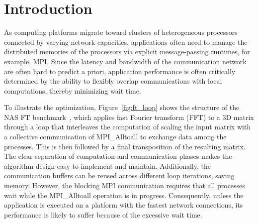 \section{Introduction}
\label{sec:intro}

As computing platforms migrate toward clusters of heterogeneous
processors connected by varying network capacities, applications often
need to manage the distributed memories of the processors via explicit
message-passing runtimes, for example, MPI.  Since the latency and
bandwidth of the communication network are often hard to predict a
priori, application performance is often critically determined by the
ability to flexibly overlap communications with local computations,
thereby minimizing wait time.

To illustrate the optimization, Figure~\ref{fig:ft_loop} shows the
structure of the NAS FT benchmark~\cite{npb}, which applies fast
Fourier transform (FFT) to a 3D matrix through a loop that interleaves
the computation of scaling the input matrix with a collective
communication of MPI\_Alltoall to exchange data among the
processes. This is then followed by a final transposition of the
resulting matrix.  The clear separation of computation and
communication phases makes the algorithm design easy to implement and
maintain.  Additionally, the communication buffers can be reused
across different loop iterations, saving memory.  However, the
blocking MPI communication requires that all processes wait while the
MPI\_Alltoall operation is in progress.  Consequently, unless the
application is executed on a platform with the fastest network
connections, its performance is likely to suffer because of the
excessive wait time.

